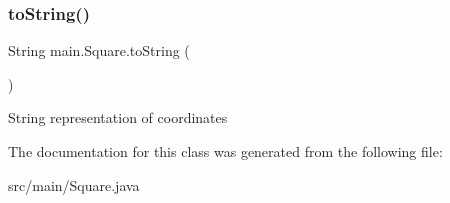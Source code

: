 \subsubsection{\texorpdfstring{to\+String()}{toString()}}
{\footnotesize\ttfamily String main.\+Square.\+to\+String (\begin{DoxyParamCaption}{ }\end{DoxyParamCaption})\hspace{0.3cm}{\ttfamily [inline]}}

String representation of coordinates 

The documentation for this class was generated from the following file\+:\begin{DoxyCompactItemize}
\item 
src/main/Square.\+java\end{DoxyCompactItemize}
